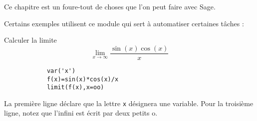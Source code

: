 
Ce chapitre est un foure-tout de choses que l'on peut faire avec Sage.


Certains exemples utilisent ce module qui sert à automatiser certaines tâches : 



\begin{example}     \label{ExBCRXooDVUdcf}
	Calculer la limite 
			\begin{equation}
				\lim_{x\to\infty}\frac{ \sin(x)\cos(x) }{ x }
			\end{equation}


            \begin{verbatim}
			var('x')
			f(x)=sin(x)*cos(x)/x
			limit(f(x),x=oo)
            \end{verbatim}
	La première ligne déclare que la lettre \texttt{x} désignera une variable. Pour la troisième ligne, notez que l'infini est écrit par deux petits \og o\fg.
\end{example}

